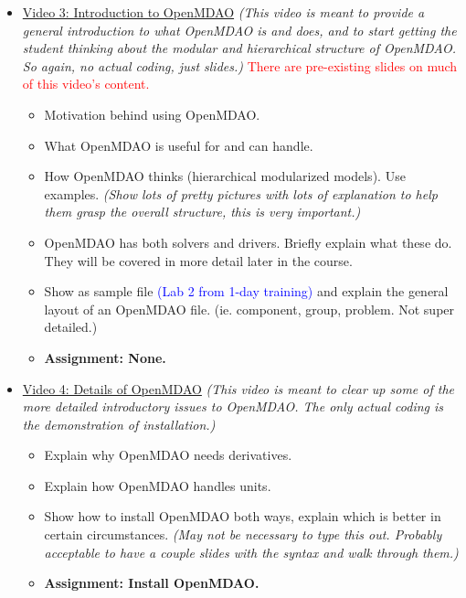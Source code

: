 \documentclass[12pt, letterpaper]{article}
\begin{document}
\begin{itemize}
	\item \underline{Video 3: Introduction to OpenMDAO} \textit{(This video is meant to provide a general introduction to what OpenMDAO is and does, and to start getting the student thinking about the modular and hierarchical structure of OpenMDAO. So again, no actual coding, just slides.)} \textcolor{red}{There are pre-existing slides on much of this video's content.}
		\begin{itemize}
			\item Motivation behind using OpenMDAO.
			\item What OpenMDAO is useful for and can handle.
			\item How OpenMDAO thinks (hierarchical modularized models). Use examples. \textit{(Show lots of pretty pictures with lots of explanation to help them grasp the overall structure, this is very important.)}
			\item OpenMDAO has both solvers and drivers. Briefly explain what these do. They will be covered in more detail later in the course.
			\item Show as sample file \textcolor{blue}{(Lab 2 from 1-day training)} and explain the general layout of an OpenMDAO file. (ie. component, group, problem. Not super detailed.)
			\item \textbf{Assignment: None.}
		\end{itemize}

	\item \underline{Video 4: Details of OpenMDAO} \textit{(This video is meant to clear up some of the more detailed introductory issues to OpenMDAO. The only actual coding is the demonstration of installation.)}
		\begin{itemize}
			\item Explain why OpenMDAO needs derivatives.
			\item Explain how OpenMDAO handles units.
			\item Show how to install OpenMDAO both ways, explain which is better in certain circumstances. \textit{(May not be necessary to type this out. Probably acceptable to have a couple slides with the syntax and walk through them.)}
			\item \textbf{Assignment: Install OpenMDAO.}
		\end{itemize}


\end{itemize}
\end{document}
